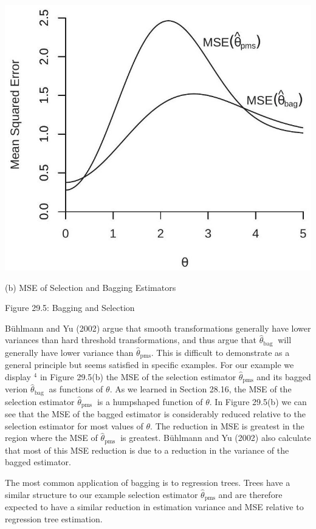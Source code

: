 \documentclass[10pt]{article}
\begin{document}
\begin{center}
\includegraphics[max width=\textwidth]{2022_11_27_70699ac9776c9435969dg-20(1)}
\end{center}

(b) MSE of Selection and Bagging Estimators

Figure 29.5: Bagging and Selection

Bühlmann and Yu (2002) argue that smooth transformations generally have lower variances than hard threshold transformations, and thus argue that $\widehat{\theta}_{\text {bag }}$ will generally have lower variance than $\widehat{\theta}_{\mathrm{pms}}$. This is difficult to demonstrate as a general principle but seems satisfied in specific examples. For our example we display ${ }^{4}$ in Figure 29.5(b) the MSE of the selection estimator $\widehat{\theta}_{\mathrm{pms}}$ and its bagged verion $\widehat{\theta}_{\text {bag }}$ as functions of $\theta$. As we learned in Section 28.16, the MSE of the selection estimator $\widehat{\theta}_{\text {pms }}$ is a humpshaped function of $\theta$. In Figure 29.5(b) we can see that the MSE of the bagged estimator is considerably reduced relative to the selection estimator for most values of $\theta$. The reduction in MSE is greatest in the region where the MSE of $\widehat{\theta}_{\text {pms }}$ is greatest. Bühlmann and Yu (2002) also calculate that most of this MSE reduction is due to a reduction in the variance of the bagged estimator.

The most common application of bagging is to regression trees. Trees have a similar structure to our example selection estimator $\widehat{\theta}_{\mathrm{pms}}$ and are therefore expected to have a similar reduction in estimation variance and MSE relative to regression tree estimation.
\end{document}
